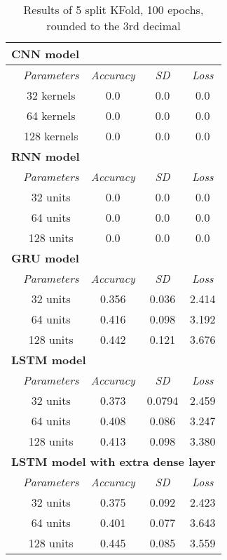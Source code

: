 \begin{table}[htbp]
  \centering
  \caption{Results of 5 split KFold, 100 epochs, rounded to the 3rd decimal}
  \label{tab:sample}
  \begin{tabular}{|cc|c|c|c|}
    \hline
    \multicolumn{5}{|l|}{\textbf{CNN model}}\\
    \hline
     {} & {\textit{Parameters}} & {\textit{Accuracy}} & {\textit{SD}} & {\textit{Loss}}\\
    \hline
     & 32 kernels & 0.0 & 0.0 & 0.0\\
     & 64 kernels & 0.0 & 0.0 & 0.0\\
     & 128 kernels & 0.0 & 0.0 & 0.0\\
    \hline
    \multicolumn{5}{|l|}{\textbf{RNN model}}\\
    \hline
     {} & {\textit{Parameters}} & {\textit{Accuracy}} & {\textit{SD}} & {\textit{Loss}}\\
    \hline
     & 32 units & 0.0 & 0.0 & 0.0\\
     & 64 units & 0.0 & 0.0 & 0.0\\
     & 128 units & 0.0 & 0.0 & 0.0\\
    \hline
    \multicolumn{5}{|l|}{\textbf{GRU model}}\\
    \hline
     {} & {\textit{Parameters}} & {\textit{Accuracy}} & {\textit{SD}} & {\textit{Loss}}\\
    \hline
     & 32 units & 0.356 & 0.036 & 2.414\\
     & 64 units & 0.416 & 0.098 & 3.192\\
     & 128 units & 0.442 & 0.121 & 3.676\\
    \hline
     
    \multicolumn{5}{|l|}{\textbf{LSTM model}}\\
    \hline
     {} & {\textit{Parameters}} & {\textit{Accuracy}} & {\textit{SD}} & {\textit{Loss}}\\
    \hline
     & 32 units & 0.373 & 0.0794 & 2.459\\
     & 64 units & 0.408 & 0.086 & 3.247\\
     & 128 units & 0.413 & 0.098 & 3.380\\
    \hline
    
    \multicolumn{5}{|l|}{\textbf{LSTM model with extra dense layer}}\\
    \hline
     {} & {\textit{Parameters}} & {\textit{Accuracy}} & {\textit{SD}} & {\textit{Loss}}\\
    \hline
     & 32 units & 0.375 & 0.092 & 2.423\\
     & 64 units & 0.401 & 0.077 & 3.643\\
     & 128 units & 0.445 & 0.085 & 3.559\\
    \hline
    

\end{tabular}
\end{table}
